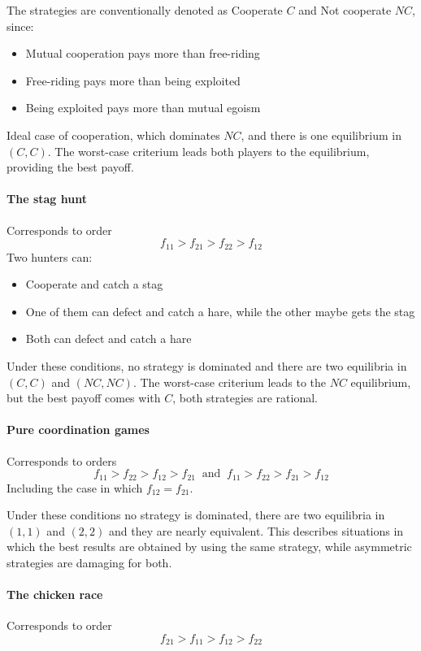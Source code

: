 The strategies are conventionally denoted as Cooperate $C$ and Not cooperate $NC$, since: 
\begin{itemize}
	\item Mutual cooperation pays more than free-riding
	
	\item Free-riding pays more than being exploited
	
	\item Being exploited pays more than mutual egoism
\end{itemize}

Ideal case of cooperation, which dominates $NC$, and there is one equilibrium in $(C,C)$. The worst-case criterium leads both players to the equilibrium, providing the best payoff.

\paragraph{The stag hunt} Corresponds to order
$$ f_{11} > f_{21} > f_{22} > f_{12} $$
Two hunters can:
\begin{itemize}
	\item Cooperate and catch a stag 
	
	\item One of them can defect and catch a hare, while the other maybe gets the stag
	
	\item Both can defect and catch a hare
\end{itemize}

Under these conditions, no strategy is dominated and there are two equilibria in $(C,C)$ and $(NC,NC)$. The worst-case criterium leads to the $NC$ equilibrium, but the best payoff comes with $C$, both strategies are rational.

\paragraph{Pure coordination games} Corresponds to orders
$$ f_{11} > f_{22} > f_{12} > f_{21} \ \text{ and } \ f_{11} > f_{22} > f_{21} > f_{12} $$
Including the case in which $f_{12} = f_{21}$. 

Under these conditions no strategy is dominated, there are two equilibria in $(1,1)$ and $(2,2)$ and they are nearly equivalent. This describes situations in which the best results are obtained by using the same strategy, while asymmetric strategies are damaging for both. 

\paragraph{The chicken race} Corresponds to order
$$ f_{21} > f_{11} > f_{12} > f_{22} $$

